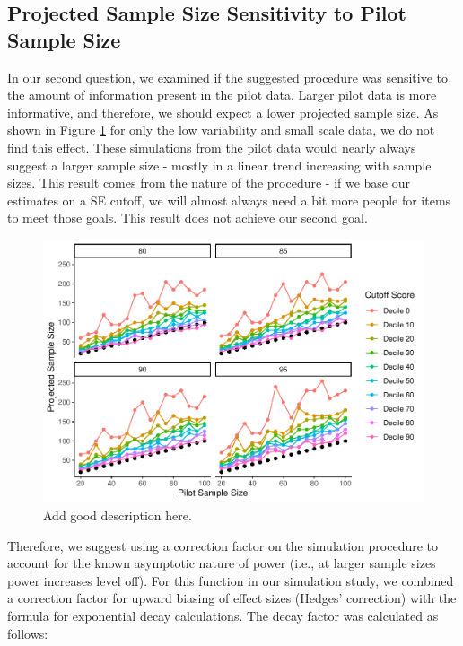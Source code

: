 \documentclass[
  man]{apa6}
\begin{document}
\hypertarget{projected-sample-size-sensitivity-to-pilot-sample-size}{%
\subsection{Projected Sample Size Sensitivity to Pilot Sample Size}\label{projected-sample-size-sensitivity-to-pilot-sample-size}}

In our second question, we examined if the suggested procedure was sensitive to the amount of information present in the pilot data. Larger pilot data is more informative, and therefore, we should expect a lower projected sample size. As shown in Figure \ref{fig:sensitive-figure} for only the low variability and small scale data, we do not find this effect. These simulations from the pilot data would nearly always suggest a larger sample size - mostly in a linear trend increasing with sample sizes. This result comes from the nature of the procedure - if we base our estimates on a SE cutoff, we will almost always need a bit more people for items to meet those goals. This result does not achieve our second goal.

\begin{figure}
\centering
\includegraphics{manuscript_draft_files/figure-latex/sensitive-figure-1.pdf}
\caption{\label{fig:sensitive-figure}Add good description here.}
\end{figure}

Therefore, we suggest using a correction factor on the simulation procedure to account for the known asymptotic nature of power (i.e., at larger sample sizes power increases level off). For this function in our simulation study, we combined a correction factor for upward biasing of effect sizes (Hedges' correction) with the formula for exponential decay calculations. The decay factor was calculated as follows:
\end{document}
